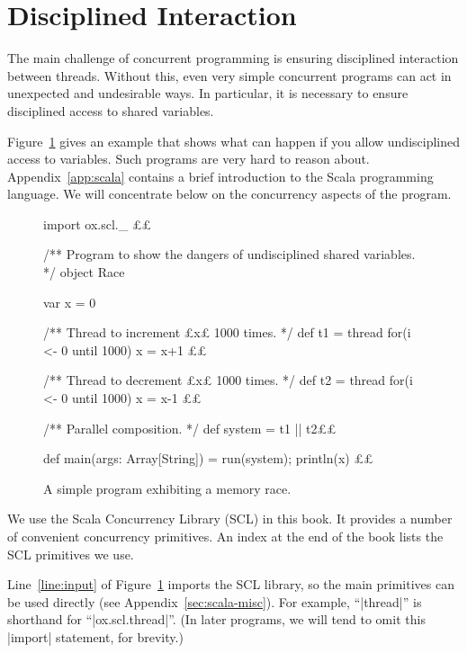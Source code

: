 \section{Disciplined Interaction}

The main challenge of concurrent programming is ensuring disciplined
interaction between threads.  Without this, even very simple concurrent
programs can act in unexpected and undesirable ways.  In particular, it is
necessary to ensure disciplined access to shared variables.

Figure~\ref{fig:race} gives an example that shows what can happen if you allow
undisciplined access to variables.  Such programs are very hard to reason
about.
Appendix~\ref{app:scala} contains a brief introduction to the Scala
programming language.  We will concentrate below on the concurrency aspects of
the program. 


\begin{figure}
\begin{scala}[numbers = left]
import ox.scl._  £\label{line:input}£

/** Program to show the dangers of undisciplined shared variables. */
object Race{
  var x = 0

  /** Thread to increment £x£ 1000 times. */
  def t1 = thread{ for(i <- 0 until 1000) x = x+1 }£\label{line:p}£

  /** Thread to decrement £x£ 1000 times. */
  def t2 = thread{ for(i <- 0 until 1000) x = x-1 }£\label{line:q}£

  /** Parallel composition. */
  def system = t1 || t2£\label{line:system}£

  def main(args: Array[String]) = { run(system); println(x) }£\label{line:main}£
}
\end{scala}%
\caption{A simple program exhibiting a memory race.}
\label{fig:race}
\end{figure}


We use the Scala Concurrency Library (SCL) in this book.  It
provides a number of convenient concurrency primitives.  An index at the end of the book lists the SCL primitives we
use.  

Line~\ref{line:input} of Figure~\ref{fig:race} imports the SCL library, so the
main primitives can be used directly (see Appendix~\ref{sec:scala-misc}).  For
example, ``|thread|'' is shorthand for ``|ox.scl.thread|''.  (In later
programs, we will tend to omit this |import| statement, for brevity.)

